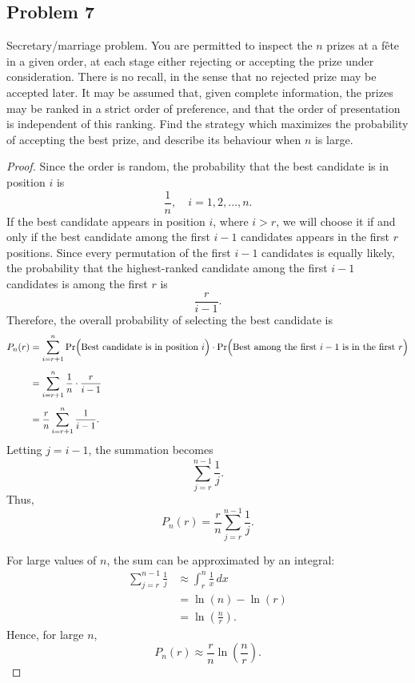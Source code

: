 \documentclass[letterpaper, 11pt]{article}
\newcommand{\1}{\mathds{1}}	%
\theoremstyle{definition}
\begin{document}
    \subsection*{Problem 7}
    Secretary/marriage problem. You are permitted to inspect the $n$ prizes at a fête in a given order, at each stage either rejecting or accepting the prize under consideration. There is no recall, in the sense that no rejected prize may be accepted later. It may be assumed that, given complete information, the prizes may be ranked in a strict order of preference, and that the order of presentation is independent of this ranking. Find the strategy which maximizes the probability of accepting the best prize, and describe its behaviour when $n$ is large.
\begin{proof}
    Since the order is random, the probability that the best candidate is in position $i$ is
\[
\frac{1}{n}, \quad i=1,2,\ldots,n.
\]
If the best candidate appears in position $i$, where $i>r$, we will choose it if and only if the best candidate among the first $i-1$ candidates appears in the first $r$ positions. Since every permutation of the first $i-1$ candidates is equally likely, the probability that the highest-ranked candidate among the first $i-1$ candidates is among the first $r$ is
\[
\frac{r}{i-1}.
\]
Therefore, the overall probability of selecting the best candidate is
\begin{align*}
P_n(r) &= \sum_{i=r+1}^{n} \Pr\Bigl(\text{Best candidate is in position } i\Bigr) \cdot \Pr\Bigl(\text{Best among the first } i-1 \text{ is in the first } r\Bigr)\\[1ex]
&=\sum_{i=r+1}^{n}\frac{1}{n} \cdot \frac{r}{i-1}\\[1ex]
&=\frac{r}{n}\sum_{i=r+1}^{n}\frac{1}{i-1}.
\end{align*}
Letting $j=i-1$, the summation becomes
\[
\sum_{j=r}^{n-1}\frac{1}{j}.
\]
Thus,
\[
P_n(r) = \frac{r}{n}\sum_{j=r}^{n-1}\frac{1}{j}.
\]

For large values of $n$, the sum can be approximated by an integral:
\begin{align*}
\sum_{j=r}^{n-1}\frac{1}{j} &\approx \int_{r}^{n}\frac{1}{x}\,dx\\[1ex]
&= \ln(n) - \ln(r)\\[1ex]
&= \ln\!\left(\frac{n}{r}\right).
\end{align*}
Hence, for large $n$,
\[
P_n(r) \approx \frac{r}{n}\ln\!\left(\frac{n}{r}\right).
\]


\end{proof}
\end{document}
